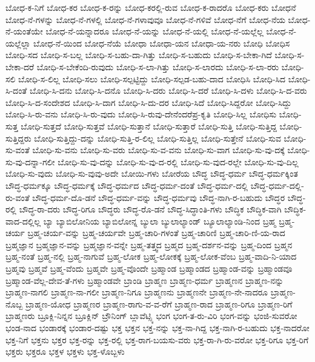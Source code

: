 {ಬೋಧ-ಕ-ನಿಗೆ
ಬೋಧ-ಕರ
ಬೋಧ-ಕ-ರನ್ನು
ಬೋಧ-ಕರಲ್ಲಿ-ರುವ
ಬೋಧ-ಕ-ರಾದರೊ
ಬೋಧ-ಕರು
ಬೋಧನೆ
ಬೋಧ-ನೆ-ಗಳನ್ನು
ಬೋಧ-ನೆ-ಗಳಲ್ಲಿ
ಬೋಧ-ನೆ-ಗಳಾವುವೂ
ಬೋಧ-ನೆ-ಗಳಿವೆ
ಬೋಧ-ನೆಗೆ
ಬೋಧ-ನೆಯ
ಬೋಧ-ನೆ-ಯಂತೆಯೇ
ಬೋಧ-ನೆ-ಯನ್ನಾದರೂ
ಬೋಧ-ನೆ-ಯನ್ನು
ಬೋಧ-ನೆ-ಯಲ್ಲಿ
ಬೋಧ-ನೆ-ಯಲ್ಲೆಲ್ಲ
ಬೋಧ-ನೆ-ಯಲ್ಲೆಲ್ಲಾ
ಬೋಧ-ನೆ-ಯಿಂದ
ಬೋಧ-ನೆಯೆ
ಬೋಧಾ
ಬೋಧಾ-ಯನ
ಬೋಧಾ-ಯ-ನರು
ಬೋಧಿ
ಬೋಧಿಸ
ಬೋಧಿ-ಸದ
ಬೋಧಿ-ಸ-ಬಲ್ಲ
ಬೋಧಿ-ಸ-ಬಹು-ದಾ-ಗಿತ್ತು
ಬೋಧಿ-ಸ-ಬಹುದು
ಬೋಧಿ-ಸ-ಬೇಕಾ-ಗಿದೆ
ಬೋಧಿ-ಸ-ಬೇಕಾ-ದರೆ
ಬೋಧಿ-ಸ-ಬೇಕೆಂದಿ-ರುವುದು
ಬೋಧಿ-ಸ-ಲಾ-ಗಿತ್ತು
ಬೋಧಿ-ಸ-ಲಾರದು
ಬೋಧಿ-ಸ-ಲಾ-ರರು
ಬೋಧಿ-ಸಲಿ
ಬೋಧಿ-ಸ-ಲಿಲ್ಲ
ಬೋಧಿ-ಸಲು
ಬೋಧಿ-ಸಲ್ಪಟ್ಟಿದ್ದು
ಬೋಧಿ-ಸಲ್ಪಡ-ಬಹು-ದಾದ
ಬೋಧಿಸಿ
ಬೋಧಿ-ಸಿದ
ಬೋಧಿ-ಸಿ-ದಂತೆ
ಬೋಧಿ-ಸಿ-ದನು
ಬೋಧಿ-ಸಿ-ದನೊ
ಬೋಧಿ-ಸಿ-ದರು
ಬೋಧಿ-ಸಿ-ದರೆ
ಬೋಧಿ-ಸಿ-ದಳು
ಬೋಧಿ-ಸಿ-ದ-ವರು
ಬೋಧಿ-ಸಿ-ದ-ಸಂದೇಶದ
ಬೋಧಿ-ಸಿ-ದಾಗ
ಬೋಧಿ-ಸಿ-ದು-ದರ
ಬೋಧಿ-ಸಿದೆ
ಬೋಧಿ-ಸಿದ್ದರೋ
ಬೋಧಿ-ಸಿದ್ದು
ಬೋಧಿ-ಸಿ-ರು-ವನು
ಬೋಧಿ-ಸಿ-ರು-ವುದು
ಬೋಧಿ-ಸಿ-ರುವು-ದೇನೆಂದರೆಪ್ರ-ಕೃತಿ
ಬೋಧಿ-ಸಿಲ್ಲ
ಬೋಧಿಸು
ಬೋಧಿ-ಸುತ್ತ
ಬೋಧಿ-ಸುತ್ತದೆ
ಬೋಧಿ-ಸುತ್ತವೆ
ಬೋಧಿ-ಸುತ್ತಾನೆ
ಬೋಧಿ-ಸುತ್ತಾರೆ
ಬೋಧಿ-ಸುತ್ತಿ
ಬೋಧಿ-ಸುತ್ತಿದ್ದ
ಬೋಧಿ-ಸುತ್ತಿದ್ದರು
ಬೋಧಿ-ಸುತ್ತಿದ್ದು-ದನ್ನು
ಬೋಧಿ-ಸುತ್ತಿ-ರ-ಲಿಲ್ಲ
ಬೋಧಿ-ಸುತ್ತಿಲ್ಲ
ಬೋಧಿ-ಸುತ್ತೇನೆ
ಬೋಧಿ-ಸುವ
ಬೋಧಿ-ಸು-ವಂತೆ
ಬೋಧಿ-ಸು-ವನು
ಬೋಧಿ-ಸು-ವರು
ಬೋಧಿ-ಸು-ವ-ವನು
ಬೋಧಿ-ಸು-ವಾಗ
ಬೋಧಿ-ಸು-ವು-ದಕ್ಕೆ
ಬೋಧಿ-ಸು-ವು-ದನ್ನಾ-ಗಲೀ
ಬೋಧಿ-ಸು-ವು-ದನ್ನು
ಬೋಧಿ-ಸು-ವು-ದ-ರಲ್ಲಿ
ಬೋಧಿ-ಸು-ವುದ-ರಲ್ಲೇ
ಬೋಧಿ-ಸು-ವು-ದಿಲ್ಲ
ಬೋಧಿ-ಸು-ವುದು
ಬೋಧಿ-ಸು-ವುವು-ಅದೇ
ಬೋಯಿ-ಗಳು
ಬೋರೆಯ
ಬೌದ್ಧ
ಬೌದ್ಧ-ಧರ್ಮ
ಬೌದ್ಧ-ಧರ್ಮಕ್ಕಿಂತ
ಬೌದ್ಧ-ಧರ್ಮಕ್ಕೂ
ಬೌದ್ಧ-ಧರ್ಮಕ್ಕೆ
ಬೌದ್ಧ-ಧರ್ಮದ
ಬೌದ್ಧ-ಧರ್ಮ-ದಂತೆ
ಬೌದ್ಧ-ಧರ್ಮ-ದಲ್ಲಿ
ಬೌದ್ಧ-ಧರ್ಮ-ದಲ್ಲಿ-ರು-ವಂತೆ
ಬೌದ್ಧ-ಧರ್ಮ-ದೊ-ಡನೆ
ಬೌದ್ಧ-ಧರ್ಮ-ವನ್ನು
ಬೌದ್ಧ-ಧರ್ಮವು
ಬೌದ್ಧ-ನಾಗಿ-ರ-ಬಹುದು
ಬೌದ್ಧರ
ಬೌದ್ಧ-ರಲ್ಲಿ
ಬೌದ್ಧ-ರಾ-ದರು
ಬೌದ್ಧ-ರಿಗೂ
ಬೌದ್ಧರು
ಬೌದ್ಧ-ರೊ-ಡನೆ
ಬೌದ್ಧ-ಸಿದ್ಧಾಂತಿ-ಗಳು
ಬೌದ್ಧಿಕ
ಬೌದ್ಧಿಕ-ವಾಗಿ
ಬೌದ್ಧಿಕ-ವಾದ-ದಲ್ಲಿಲ್ಲ
ಬ್ಯಾ
ಬ್ಯಾಬಿಲೋನಿಯ
ಬ್ಯಾಬಿಲೋನ್ನ
ಬ್ಯುಲಾ
ಬ್ಯುಲಾಲ್ಯಾಂಡ್
ಬ್ಯೂಲಾಲ್ಯಾಂಡಿ-ನಿಂದ
ಬ್ರಹ್ಮ
ಬ್ರಹ್ಮ-ಚರ್ಯ
ಬ್ರಹ್ಮ-ಚರ್ಯ-ವನ್ನು
ಬ್ರಹ್ಮ-ಚರ್ಯವೇ
ಬ್ರಹ್ಮ-ಚಾರಿ-ಗಳಂತೆ
ಬ್ರಹ್ಮ-ಚಾರಿಣಿ
ಬ್ರಹ್ಮ-ಚಾರಿ-ಣಿ-ಯ-ರಾದ
ಬ್ರಹ್ಮಜ್ಞಾನ
ಬ್ರಹ್ಮಜ್ಞಾನ-ವನ್ನು
ಬ್ರಹ್ಮಜ್ಞಾನ-ವನ್ನೇ
ಬ್ರಹ್ಮ-ತತ್ತ್ವದ
ಬ್ರಹ್ಮದ
ಬ್ರಹ್ಮ-ದರ್ಶನ-ವನ್ನು
ಬ್ರಹ್ಮ-ದಿಂದ
ಬ್ರಹ್ಮನ
ಬ್ರಹ್ಮ-ನಂತೆ
ಬ್ರಹ್ಮ-ನಲ್ಲಿ
ಬ್ರಹ್ಮ-ನಾಗುವೆ
ಬ್ರಹ್ಮ-ಲೋಕ
ಬ್ರಹ್ಮ-ಲೋಕಕ್ಕೆ
ಬ್ರಹ್ಮ-ಲೋಕ-ವೆಂಬ
ಬ್ರಹ್ಮ-ವಾದಿ-ನಿ-ಯಾದ
ಬ್ರಹ್ಮವು
ಬ್ರಹ್ಮವೆ
ಬ್ರಹ್ಮ-ವೆಂದು
ಬ್ರಹ್ಮವೇ
ಬ್ರಹ್ಮ-ವೊಂದೇ
ಬ್ರಹ್ಮಾಂಡ
ಬ್ರಹ್ಮಾಂಡದ
ಬ್ರಹ್ಮಾಂಡ-ವನ್ನು
ಬ್ರಹ್ಮಾಂಡವೂ
ಬ್ರಹ್ಮಾಂಡ-ವೆಲ್ಲ-ದೇವ-ತೆ-ಗಳು
ಬ್ರಹ್ಮಾಂಡವೇ
ಬ್ರಾಂಡಿ
ಬ್ರಾಹ್ಮಣ
ಬ್ರಾಹ್ಮಣ-ಧರ್ಮ
ಬ್ರಾಹ್ಮಣನ
ಬ್ರಾಹ್ಮಣ-ನನ್ನು
ಬ್ರಾಹ್ಮಣ-ನಾಗಲಿ
ಬ್ರಾಹ್ಮಣ-ನಾ-ಗಲೀ
ಬ್ರಾಹ್ಮಣ-ನಿಗೂ
ಬ್ರಾಹ್ಮಣನು
ಬ್ರಾಹ್ಮಣನೇ
ಬ್ರಾಹ್ಮಣ-ನೇ-ನಾದರೂ
ಬ್ರಾಹ್ಮಣ-ನೊಬ್ಬ
ಬ್ರಾಹ್ಮಣ-ಯೋಧ
ಬ್ರಾಹ್ಮಣರ
ಬ್ರಾಹ್ಮಣ-ರಾಗು-ವ-ವ-ರೆಗೆ
ಬ್ರಾಹ್ಮಣ-ರಾದ
ಬ್ರಾಹ್ಮಣ-ರಿಗೂ
ಬ್ರಾಹ್ಮಣ-ರಿಗೆ
ಬ್ರಾಹ್ಮಣರು
ಬ್ರೂಕ್ಲಿ-ನಿನ್ನನ
ಬ್ರೂಕ್ಲಿನ್
ಬ್ರೌನಿಂಗ್
ಬ್ಲಾವೆಟ್ಸ್ಕಿ
ಭಂಗ
ಭಂಗ-ತ-ರು-ವಿರಿ
ಭಂಗ-ವನ್ನು
ಭಂಜಿ-ಸುವರೋ
ಭಂಡ-ನಾದ
ಭಂಡಾರಕ್ಕೆ
ಭಂಡಾರ-ದಷ್ಟು
ಭಕ್ತ
ಭಕ್ತನ
ಭಕ್ತ-ನನ್ನು
ಭಕ್ತ-ನಾ-ಗಿದ್ದ
ಭಕ್ತ-ನಾಗಿ-ರ-ಬಹುದು
ಭಕ್ತ-ನಾದರೋ
ಭಕ್ತ-ನಿಗೆ
ಭಕ್ತನು
ಭಕ್ತರ
ಭಕ್ತ-ರನ್ನು
ಭಕ್ತ-ರಲ್ಲಿ
ಭಕ್ತ-ರಾಗ-ಬಯಸು-ವರು
ಭಕ್ತ-ರಾ-ಗಿ-ರು-ವರೋ
ಭಕ್ತ-ರಿಗೂ
ಭಕ್ತ-ರಿಗೆ
ಭಕ್ತರು
ಭಕ್ತರೂ
ಭಕ್ತಳ
ಭಕ್ತಳು
ಭಕ್ತ-ಳೊಬ್ಬಳು
}
